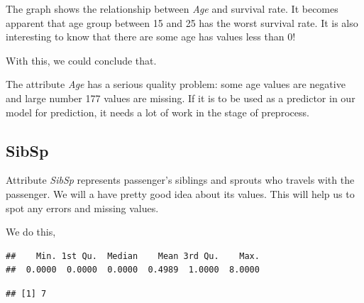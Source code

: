 \documentclass[
]{book}
\newenvironment{Shaded}{\begin{snugshade}}{\end{snugshade}}
\newcommand{\CommentTok}[1]{\textcolor[rgb]{0.56,0.35,0.01}{\textit{#1}}}
\newcommand{\KeywordTok}[1]{\textcolor[rgb]{0.13,0.29,0.53}{\textbf{#1}}}
\newcommand{\NormalTok}[1]{#1}
\newcommand{\OperatorTok}[1]{\textcolor[rgb]{0.81,0.36,0.00}{\textbf{#1}}}
\begin{document}
The graph shows the relationship between \emph{Age} and survival rate. It becomes apparent that age group between 15 and 25 has the worst survival rate. It is also interesting to know that there are some age has values less than 0!

With this, we could conclude that.

The attribute \emph{Age} has a serious quality problem: some age values are negative and large number 177 values are missing. If it is to be used as a predictor in our model for prediction, it needs a lot of work in the stage of preprocess.

\hypertarget{sibsp}{%
\subsection{SibSp}\label{sibsp}}

Attribute \emph{SibSp} represents passenger's siblings and sprouts who travels with the passenger. We will a have pretty good idea about its values. This will help us to spot any errors and missing values.

We do this,

\begin{Shaded}
\end{Shaded}

\begin{verbatim}
##    Min. 1st Qu.  Median    Mean 3rd Qu.    Max. 
##  0.0000  0.0000  0.0000  0.4989  1.0000  8.0000
\end{verbatim}

\begin{Shaded}
\end{Shaded}

\begin{verbatim}
## [1] 7
\end{verbatim}

\begin{Shaded}
\end{Shaded}
\end{document}
